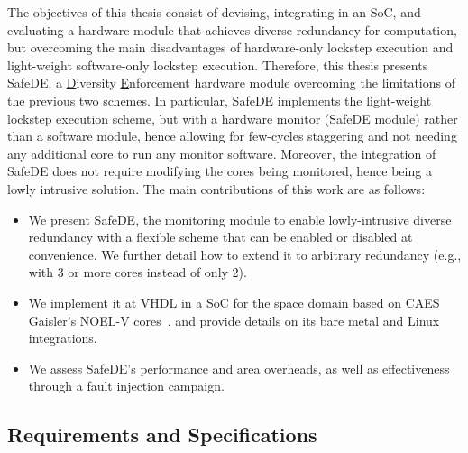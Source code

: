 The objectives of this thesis consist of devising, integrating in an SoC, and evaluating a hardware module that achieves diverse redundancy for computation, but overcoming the main disadvantages of hardware-only lockstep execution and light-weight software-only lockstep execution. 
Therefore, this thesis presents SafeDE, a \underline{D}iversity \underline{E}nforcement hardware module overcoming the limitations of the previous two schemes. In particular, SafeDE implements the light-weight lockstep execution scheme, but with a hardware monitor (SafeDE module) rather than a software module, hence allowing for few-cycles staggering and not needing any additional core to run any monitor software. Moreover, the integration of SafeDE does not require modifying the cores being monitored, hence being a lowly intrusive solution.
The main contributions of this work are as follows:
\begin{itemize}
\item We present SafeDE, the monitoring module to enable lowly-intrusive diverse redundancy with a flexible scheme that can be enabled or disabled at convenience. We further detail how to extend it to arbitrary redundancy (e.g., with 3 or more cores instead of only 2).
\item We implement it at VHDL in a SoC for the space domain based on CAES Gaisler's NOEL-V cores~\cite{SELENEgit}, and provide details on its bare metal and Linux integrations.
\item We assess SafeDE's performance and area overheads, as well as effectiveness through a fault injection campaign.
\end{itemize}



\subsection{Requirements and Specifications}

